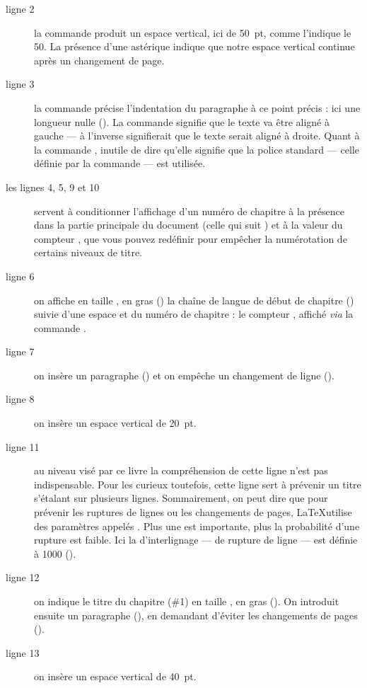 \begin{description}
\item[ligne 2]la commande   produit un espace vertical, ici de 50~pt, comme l'indique le 50. La présence d'une astérique indique que notre espace vertical continue après un changement de page.
\item[ligne 3]la commande  précise l'indentation du paragraphe à ce point précis : ici une longueur nulle (). La commande  signifie que le texte va être aligné à gauche --- à l'inverse  signifierait que le texte serait aligné à droite. Quant à la commande , inutile de dire qu'elle signifie que la police standard --- celle définie par la commande  --- est utilisée.
\item[les lignes 4, 5, 9 et 10] servent à conditionner l'affichage d'un numéro de chapitre à la présence dans la partie principale du document (celle qui suit ) et à la valeur du compteur , que vous pouvez redéfinir pour empêcher la numérotation de certains niveaux de titre.
\item[ligne 6] on affiche en taille , en gras () la chaîne de langue de début de chapitre () suivie d'une espace et du numéro de chapitre : le compteur , affiché \emph{via} la commande .
\item[ligne 7] on insère un paragraphe () et on empêche un changement de ligne ().
\item[ligne 8] on insère un espace vertical de 20~pt.
\item[ligne 11] au niveau visé par ce livre la compréhension de cette ligne n'est pas indispensable. Pour les curieux toutefois, cette ligne sert à prévenir un titre s'étalant sur plusieurs lignes. Sommairement, on peut dire que pour prévenir les ruptures de lignes ou les changements de pages, \LaTeX utilise des paramètres appelés . Plus une  est importante, plus la probabilité d'une rupture est faible. Ici la  d'interlignage --- de rupture de ligne --- est définie à 1000 (). 
\item[ligne 12] on indique le titre du chapitre (\#1) en taille , en gras (). On introduit ensuite un paragraphe (), en demandant d'éviter les changements de pages ().
\item[ligne 13]on insère un espace vertical de 40~pt.
\end{description}

